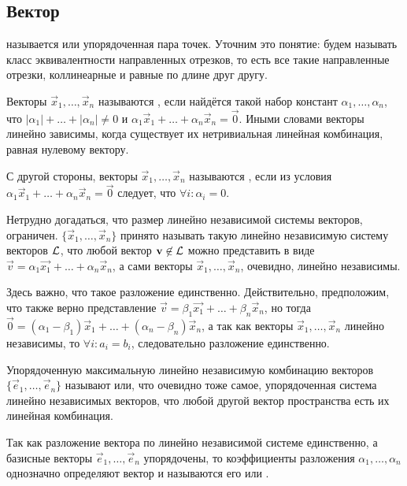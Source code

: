 \subsection{Вектор}
 называется  или упорядоченная пара точек. Уточним это понятие:  будем называть класс эквивалентности направленных отрезков, то есть все такие направленные отрезки, коллинеарные и равные по длине друг другу.
	
	Векторы $\vec{x}_1, \ldots, \vec{x}_n$ называются , если найдётся такой набор констант $\alpha_1, \ldots, \alpha_n$, что $|\alpha_1| + \ldots + |\alpha_n| \not= 0$ и $\alpha_1 \vec{x}_1 + \ldots + \alpha_n \vec{x}_n = \vec{0}$. Иными словами векторы линейно зависимы, когда существует их нетривиальная линейная комбинация, равная нулевому вектору.
	
	С другой стороны, векторы $\vec{x}_1, \ldots, \vec{x}_n$ называются , если из условия $\alpha_1 \vec{x}_1 + \ldots + \alpha_n \vec{x}_n = \vec{0}$ следует, что $\forall i : \alpha_i = 0$.
	
	Нетрудно догадаться, что размер линейно независимой системы векторов, ограничен.  $\{\vec{x}_1, \ldots, \vec{x}_n\}$ принято называть такую линейно независимую систему векторов $\mathcal{L}$, что любой вектор $\mathbf{v} \not\in \mathcal{L}$ можно представить в виде $\vec{v} = \alpha_1 \vec{x_1} + \ldots + \alpha_n \vec{x}_n$, а сами векторы $\vec{x}_1, \ldots, \vec{x}_n$, очевидно, линейно независимы. 
	
	Здесь важно, что такое разложение единственно. Действительно, предположим, что также верно представление $\vec{v} = \beta_1 \vec{x_1} + \ldots + \beta_n \vec{x}_n$, но тогда $\vec{0} = (\alpha_1 - \beta_1) \vec{x}_1 + \ldots + (\alpha_n - \beta_n) \vec{x}_n$, а так как векторы $\vec{x}_1, \ldots, \vec{x}_n$ линейно независимы, то $\forall i: a_i = b_i$, следовательно разложение единственно.
	
	Упорядоченную максимальную линейно независимую комбинацию векторов $\{\vec{e}_1, \ldots, \vec{e}_n \}$ называют  или, что очевидно тоже самое, упорядоченная система линейно независимых векторов, что любой другой вектор пространства есть их линейная комбинация. 
	
	Так как разложение вектора по линейно независимой системе единственно, а базисные векторы $\vec{e}_1, \ldots, \vec{e}_n$ упорядочены, то коэффициенты разложения $\alpha_1, \ldots, \alpha_n$ однозначно определяют вектор и называются его  или .
	
